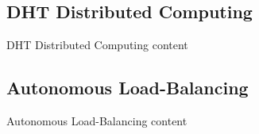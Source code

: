 \documentclass[11pt,aspectratio=169]{beamer}
\begin{document}
\subsection{DHT Distributed Computing}
\begin{frame}{DHT Distributed Computing}
	content
\end{frame}



\subsection{Autonomous Load-Balancing}
\begin{frame}{Autonomous Load-Balancing}
	content
\end{frame}




\end{document}
